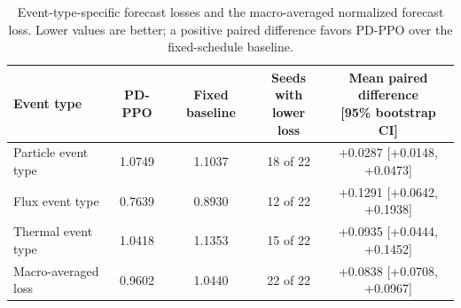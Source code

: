\begin{table}[htbp]
  \centering
  \caption{Event-type-specific forecast losses and the macro-averaged normalized forecast loss. Lower values are better; a positive paired difference favors PD-PPO over the fixed-schedule baseline.}
  \label{tab:clean_regime_decomposition}
  \scriptsize
  \setlength{\tabcolsep}{2.6pt}
  \begin{tabular}{@{}lcccc@{}}
    \toprule
    Event type & PD-PPO & Fixed baseline & \shortstack{Seeds with\\lower loss} & \shortstack{Mean paired difference\\{[95\% bootstrap CI]}} \\
    \midrule
    Particle event type & 1.0749 & 1.1037 & 18 of 22 & +0.0287 [+0.0148, +0.0473] \\
    Flux event type & 0.7639 & 0.8930 & 12 of 22 & +0.1291 [+0.0642, +0.1938] \\
    Thermal event type & 1.0418 & 1.1353 & 15 of 22 & +0.0935 [+0.0444, +0.1452] \\
    Macro-averaged loss & 0.9602 & 1.0440 & 22 of 22 & +0.0838 [+0.0708, +0.0967] \\
    \bottomrule
  \end{tabular}
\end{table}
